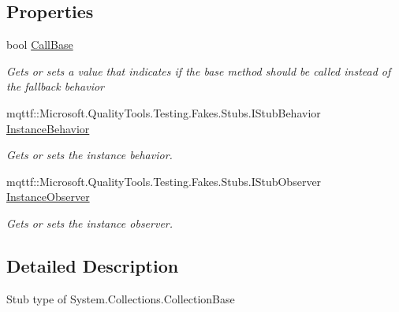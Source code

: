 \subsection*{Properties}
\begin{DoxyCompactItemize}
\item 
bool \hyperlink{class_system_1_1_collections_1_1_fakes_1_1_stub_collection_base_a2e297fb093e55ecb488cfcb8d514bab6}{Call\-Base}
\begin{DoxyCompactList}\small\item\em Gets or sets a value that indicates if the base method should be called instead of the fallback behavior\end{DoxyCompactList}\item 
mqttf\-::\-Microsoft.\-Quality\-Tools.\-Testing.\-Fakes.\-Stubs.\-I\-Stub\-Behavior \hyperlink{class_system_1_1_collections_1_1_fakes_1_1_stub_collection_base_a43dbcd989d36f9287615bb69d6a98c55}{Instance\-Behavior}
\begin{DoxyCompactList}\small\item\em Gets or sets the instance behavior.\end{DoxyCompactList}\item 
mqttf\-::\-Microsoft.\-Quality\-Tools.\-Testing.\-Fakes.\-Stubs.\-I\-Stub\-Observer \hyperlink{class_system_1_1_collections_1_1_fakes_1_1_stub_collection_base_a6d16a1bc6a70bf64e7b41bf14df45d91}{Instance\-Observer}
\begin{DoxyCompactList}\small\item\em Gets or sets the instance observer.\end{DoxyCompactList}\end{DoxyCompactItemize}


\subsection{Detailed Description}
Stub type of System.\-Collections.\-Collection\-Base



